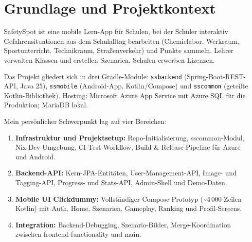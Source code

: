 
\maketitle
\setcounter{section}{0}

\section{Grundlage und Projektkontext}

SafetySpot ist eine mobile Lern-App für Schulen, bei der Schüler interaktiv
Gefahrensituationen aus dem Schulalltag bearbeiten (Chemielabor, Werkraum,
Sportunterricht, Technikraum, Straßenverkehr) und Punkte sammeln.
Lehrer verwalten Klassen und erstellen Szenarien.
Schulen erwerben Lizenzen.

Das Projekt gliedert sich in drei Gradle-Module:
\texttt{ssbackend} (Spring-Boot-REST-API, Java 25),
\texttt{ssmobile} (Android-App, Kotlin/Compose)
und \texttt{sscommon} (geteilte Kotlin-Bibliothek).
Hosting: Microsoft Azure App Service mit Azure SQL für die Produktion;
MariaDB lokal.

Mein persönlicher Schwerpunkt lag auf vier Bereichen:

\begin{enumerate}
  \item \textbf{Infrastruktur und Projektsetup:} Repo-Initialisierung,
        sscommon-Modul, Nix-Dev-Umgebung, CI-Test-Workflow,
        Build-\&-Release-Pipeline für Azure und Android.
  \item \textbf{Backend-API:} Kern-JPA-Entitäten, User-Management-API,
        Image- und Tagging-API, Progress- und Stats-API,
        Admin-Shell und Demo-Daten.
  \item \textbf{Mobile UI Clickdummy:} Vollständiger Compose-Prototyp
        (\textasciitilde{}4\,000 Zeilen Kotlin) mit Auth, Home, Szenarien,
        Gameplay, Ranking und Profil-Screens.
  \item \textbf{Integration:} Backend-Debugging, Szenario-Bilder,
        Merge-Koordination zwischen frontend-functionality und main.
\end{enumerate}

